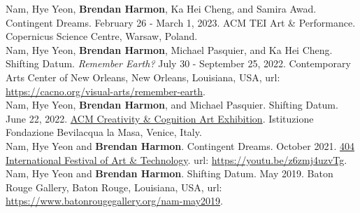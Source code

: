 \documentclass[10pt]{developercv} %
\begin{document}
\printbibliography[title={\cvsect{Select presentations}}, type=unpublished, heading=subbibliography]

\printbibliography[title={\cvsect{Reports}}, type=report, heading=subbibliography]


\printbibliography[title={\cvsect{Software}}, type=software, heading=subbibliography]


\printbibliography[title={\cvsect{Datasets}}, type=dataset, heading=subbibliography]




Nam, Hye Yeon, \textbf{Brendan Harmon}, Ka Hei Cheng, and Samira Awad. Contingent Dreams. February 26 - March 1, 2023. ACM TEI Art \& Performance. Copernicus Science Centre, Warsaw, Poland.\\

Nam, Hye Yeon, \textbf{Brendan Harmon}, Michael Pasquier, and Ka Hei Cheng. Shifting Datum. \emph{Remember Earth?} July 30 - September 25, 2022. Contemporary Arts Center of New Orleans, New Orleans, Louisiana, USA, url: \url{https://cacno.org/visual-arts/remember-earth}.\\

Nam, Hye Yeon, \textbf{Brendan Harmon}, and Michael Pasquier. Shifting Datum. June 22, 2022. \href{https://cc.acm.org/2022/}{ACM Creativity \& Cognition Art Exhibition}. Istituzione Fondazione Bevilacqua la Masa, Venice, Italy.\\

Nam, Hye Yeon and \textbf{Brendan Harmon}. Contingent Dreams. October 2021. \href{https://www.404festival.com}{404 International Festival of Art \& Technology}. url: \url{https://youtu.be/z6zmj4uzvTg}.\\

Nam, Hye Yeon and \textbf{Brendan Harmon}. Shifting Datum. May 2019. Baton Rouge Gallery, Baton Rouge, Louisiana, USA, url: \url{https://www.batonrougegallery.org/nam-may2019}.\\
\end{document}
